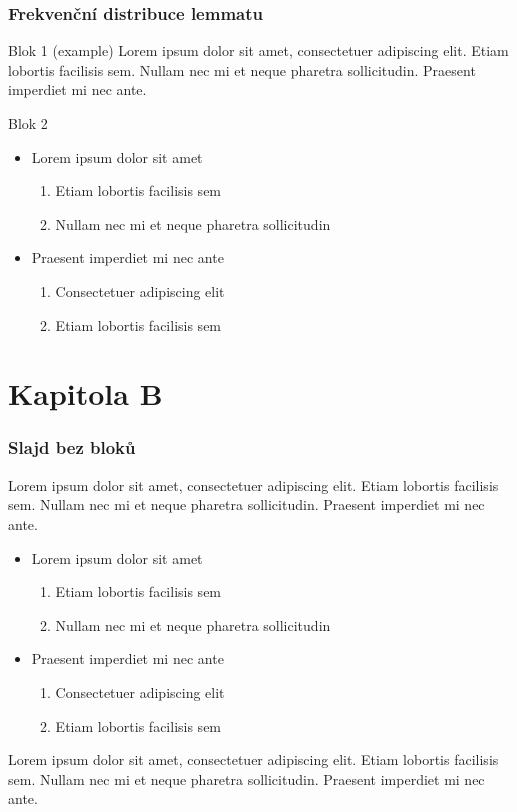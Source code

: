 \documentclass{beamer}
\begin{document}
\frame
{
  \frametitle{Frekvenční distribuce lemmatu}
  \begin{exampleblock}{Blok 1 (example)}
  Lorem ipsum dolor sit amet, \alert{consectetuer adipiscing elit}. Etiam
lobortis facilisis sem. Nullam nec mi et neque pharetra sollicitudin.
Praesent imperdiet mi nec ante.
  \end{exampleblock}
  \begin{block}{Blok 2}
  \begin{itemize}
    \item Lorem ipsum dolor sit amet
    \begin{enumerate}
      \item Etiam lobortis facilisis sem
      \item Nullam nec mi et neque pharetra sollicitudin
    \end{enumerate}
    \item Praesent imperdiet mi nec ante
    \begin{enumerate}
      \item Consectetuer adipiscing elit
      \item Etiam lobortis facilisis sem
    \end{enumerate}
  \end{itemize}
  \end{block}
}

\section{Kapitola B}

\frame
{
  \frametitle{Slajd bez bloků}

Lorem ipsum dolor sit amet, consectetuer adipiscing elit. Etiam
lobortis facilisis sem. Nullam nec mi et neque pharetra sollicitudin.
Praesent imperdiet mi nec ante.

  \begin{itemize}
    \item Lorem ipsum dolor sit amet
    \begin{enumerate}
      \item Etiam lobortis facilisis sem
      \item Nullam nec mi et neque pharetra sollicitudin
    \end{enumerate}
    \item Praesent imperdiet mi nec ante
    \begin{enumerate}
      \item Consectetuer adipiscing elit
      \item Etiam lobortis facilisis sem
    \end{enumerate}
  \end{itemize}

Lorem ipsum dolor sit amet, consectetuer adipiscing elit. Etiam
lobortis facilisis sem. Nullam nec mi et neque pharetra sollicitudin.
Praesent imperdiet mi nec ante.

}

\end{document}
